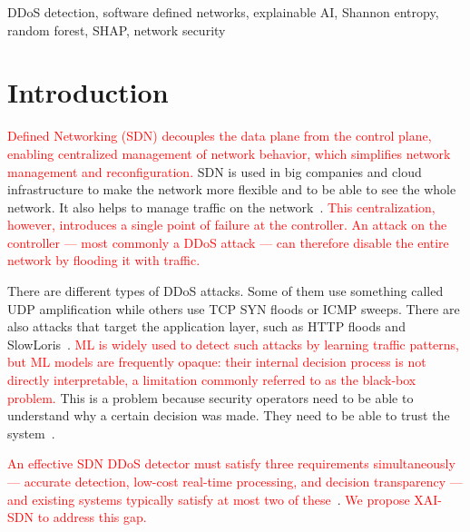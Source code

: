 \documentclass{ieeeaccess}
\begin{document}
\begin{keywords}
DDoS detection, software defined networks, explainable AI, Shannon entropy, random forest, SHAP, network security
\end{keywords}

\titlepgskip=-21pt

\maketitle

\section{Introduction}
\label{sec:intro}

 \textcolor{red}{Defined Networking (SDN) decouples the data plane from the control plane, enabling centralized management of network behavior, which simplifies network management and reconfiguration.} SDN is used in big companies and cloud infrastructure to make the network more flexible and to be able to see the whole network. It also helps to manage traffic on the network~\cite{mckeown2008openflow,kreutz2015sdn}. \textcolor{red}{This centralization, however, introduces a single point of failure at the controller.} \textcolor{red}{An attack on the controller --- most commonly a DDoS attack --- can therefore disable the entire network by flooding it with traffic.}

There are different types of DDoS attacks. Some of them use something called UDP amplification while others use TCP SYN floods or ICMP sweeps. There are also attacks that target the application layer, such as HTTP floods and SlowLoris~\cite{mirkovic2004taxonomy,sharafaldin2019ddos,bhuyan2014network}. \textcolor{red}{ML is widely used to detect such attacks by learning traffic patterns, but ML models are frequently opaque: their internal decision process is not directly interpretable, a limitation commonly referred to as the black-box problem.} This is a problem because security operators need to be able to understand why a certain decision was made. They need to be able to trust the system~\cite{arrieta2020xai,guidotti2018survey,warnecke2020evaluating}.

\textcolor{red}{An effective SDN DDoS detector must satisfy three requirements simultaneously --- accurate detection, low-cost real-time processing, and decision transparency --- and existing systems typically satisfy at most two of these}~\cite{mousavi2015early}. \textcolor{red}{We propose XAI-SDN to address this gap.}
\end{document}
